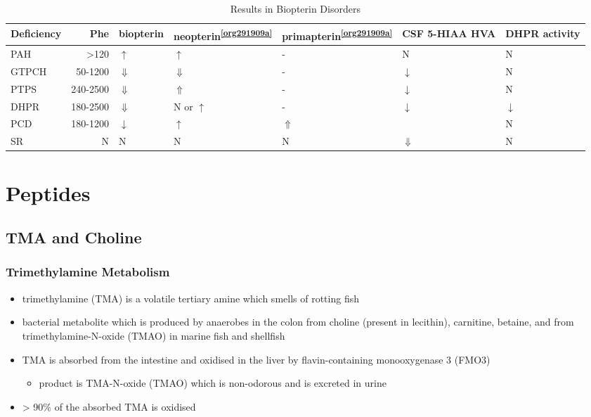 \documentclass[12pt]{scrartcl}
\begin{document}
\begin{table}[htbp]
\caption{\label{tab:org060a6b5}Results in Biopterin Disorders}
\centering
\begin{tabular}{lrlllll}
Deficiency & Phe & biopterin\footnotemark & neopterin\textsuperscript{\ref{org291909a}} & primapterin\textsuperscript{\ref{org291909a}} & CSF 5-HIAA HVA & DHPR activity\\
\hline
PAH & \textgreater{}120 & \(\uparrow\) & \(\uparrow\) & - & N & N\\
GTPCH & 50-1200 & \(\Downarrow\) & \(\Downarrow\) & - & \(\downarrow\) & N\\
PTPS & 240-2500 & \(\Downarrow\) & \(\Uparrow\) & - & \(\downarrow\) & N\\
DHPR & 180-2500 & \(\Downarrow\) & N or \(\uparrow\) & - & \(\downarrow\) & \(\downarrow\)\\
PCD & 180-1200 & \(\downarrow\) & \(\uparrow\) & \(\Uparrow\) &  & N\\
SR & N & N & N & N & \(\Downarrow\) & N\\
\end{tabular}
\end{table}
\section{Peptides}
\label{sec:org8b5c32d}
\subsection{TMA and Choline}
\label{sec:org3b29f51}
\subsubsection{Trimethylamine Metabolism}
\label{sec:orga91d393}
\begin{itemize}
\item trimethylamine (TMA) is a volatile tertiary amine which smells of rotting fish
\item bacterial metabolite which is produced by anaerobes in the colon
from choline (present in lecithin), carnitine, betaine, and from
trimethylamine-N-oxide (TMAO) in marine fish and shellfish
\item TMA is absorbed from the intestine and oxidised in the liver by
flavin-containing monooxygenase 3 (FMO3)
\begin{itemize}
\item product is TMA-N-oxide (TMAO) which is non-odorous and is
excreted in urine
\end{itemize}
\item \textgreater{} 90\% of the absorbed TMA is oxidised
\end{itemize}
\end{document}
